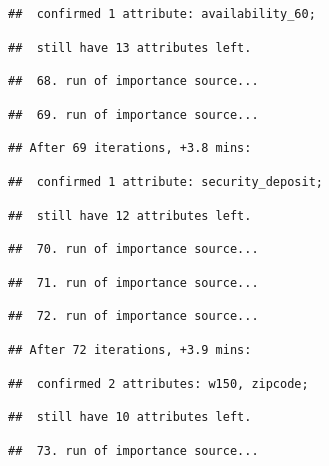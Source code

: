 \documentclass[
]{article}
\begin{document}
\begin{verbatim}
##  confirmed 1 attribute: availability_60;
\end{verbatim}

\begin{verbatim}
##  still have 13 attributes left.
\end{verbatim}

\begin{verbatim}
##  68. run of importance source...
\end{verbatim}

\begin{verbatim}
##  69. run of importance source...
\end{verbatim}

\begin{verbatim}
## After 69 iterations, +3.8 mins:
\end{verbatim}

\begin{verbatim}
##  confirmed 1 attribute: security_deposit;
\end{verbatim}

\begin{verbatim}
##  still have 12 attributes left.
\end{verbatim}

\begin{verbatim}
##  70. run of importance source...
\end{verbatim}

\begin{verbatim}
##  71. run of importance source...
\end{verbatim}

\begin{verbatim}
##  72. run of importance source...
\end{verbatim}

\begin{verbatim}
## After 72 iterations, +3.9 mins:
\end{verbatim}

\begin{verbatim}
##  confirmed 2 attributes: w150, zipcode;
\end{verbatim}

\begin{verbatim}
##  still have 10 attributes left.
\end{verbatim}

\begin{verbatim}
##  73. run of importance source...
\end{verbatim}
\end{document}
